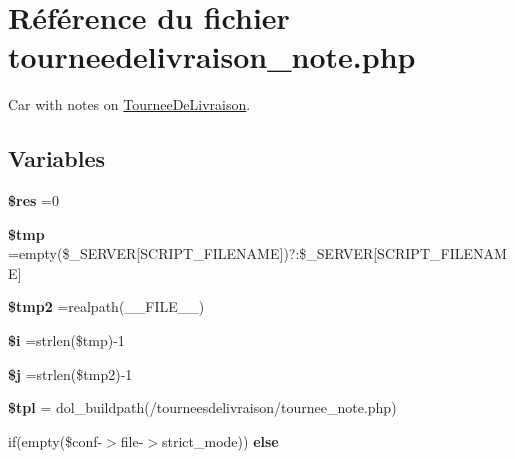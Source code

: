 \hypertarget{tourneedelivraison__note_8php}{}\section{Référence du fichier tourneedelivraison\+\_\+note.\+php}
\label{tourneedelivraison__note_8php}


Car with notes on \hyperlink{classTourneeDeLivraison}{Tournee\+De\+Livraison}.  


\subsection*{Variables}
\begin{DoxyCompactItemize}
\item 
\mbox{\label{tourneedelivraison__note_8php_a49a8a4009b02e49717caa88b128affc5}} 
{\bfseries \$res} =0
\item 
\mbox{\label{tourneedelivraison__note_8php_a57024d47cf8348153f5fdda16f8fefa9}} 
{\bfseries \$tmp} =empty(\$\+\_\+\+S\+E\+R\+V\+ER\mbox{[}\textquotesingle{}S\+C\+R\+I\+P\+T\+\_\+\+F\+I\+L\+E\+N\+A\+ME\textquotesingle{}\mbox{]})?\textquotesingle{}\textquotesingle{}\+:\$\+\_\+\+S\+E\+R\+V\+ER\mbox{[}\textquotesingle{}S\+C\+R\+I\+P\+T\+\_\+\+F\+I\+L\+E\+N\+A\+ME\textquotesingle{}\mbox{]}
\item 
\mbox{\label{tourneedelivraison__note_8php_aed9bcb6730d1510376ce80e32bd9504d}} 
{\bfseries \$tmp2} =realpath(\+\_\+\+\_\+\+F\+I\+L\+E\+\_\+\+\_\+)
\item 
\mbox{\label{tourneedelivraison__note_8php_a83018d9153d17d91fbcf3bc10158d34f}} 
{\bfseries \$i} =strlen(\$tmp)-\/1
\item 
\mbox{\label{tourneedelivraison__note_8php_a6f16db779ef3ccea921b277b5dc245d1}} 
{\bfseries \$j} =strlen(\$tmp2)-\/1
\item 
\mbox{\label{tourneedelivraison__note_8php_a04b1944cdb09f9a4e290cde7a12499e6}} 
{\bfseries \$tpl} = dol\+\_\+buildpath(\textquotesingle{}/tourneesdelivraison/tournee\+\_\+note.\+php\textquotesingle{})
\item 
if(empty(\$conf-\/$>$file-\/$>$strict\+\_\+mode)) {\bfseries else}
\end{DoxyCompactItemize}


